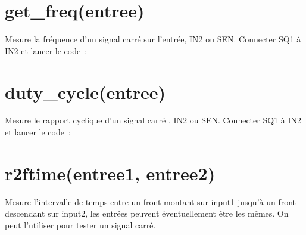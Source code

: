 \documentclass[a4paper,12pt,french]{sphinxmanual}
\begin{document}
\begin{sphinxVerbatim}[commandchars=\\\{\}]
            
\end{sphinxVerbatim}


\section{get\_freq(entree)}
\label{\detokenize{9.0:get-freq-entree}}
Mesure la fréquence d’un signal carré sur l’entrée, IN2 ou SEN. Connecter
SQ1 à IN2 et lancer le code :

\begin{sphinxVerbatim}[commandchars=\\\{\}]
 
\end{sphinxVerbatim}


\section{duty\_cycle(entree)}
\label{\detokenize{9.0:duty-cycle-entree}}
Mesure le rapport cyclique d’un signal carré , IN2 ou SEN. Connecter
SQ1 à IN2 et lancer le code :

\begin{sphinxVerbatim}[commandchars=\\\{\}]
 
 
\end{sphinxVerbatim}


\section{r2ftime(entree1, entree2)}
\label{\detokenize{9.0:r2ftime-entree1-entree2}}
Mesure l’intervalle de temps entre un front montant sur input1 jusqu’à
un front descendant sur input2, les entrées peuvent éventuellement
être les mêmes. On peut l’utiliser pour tester un signal carré.
\end{document}
